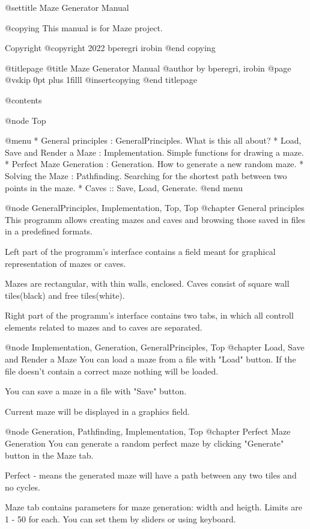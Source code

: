 
@settitle Maze Generator Manual

@copying
This manual is for Maze project.

Copyright @copyright{} 2022 bperegri irobin
@end copying

@titlepage
@title Maze Generator Manual
@author by bperegri, irobin
@page
@vskip 0pt plus 1filll
@insertcopying
@end titlepage

@contents

@node Top

@menu
* General principles : GeneralPrinciples. What is this all about?
* Load, Save and Render a Maze : Implementation. Simple functions for drawing a maze.
* Perfect Maze Generation : Generation. How to generate a new random maze.
* Solving the Maze : Pathfinding. Searching for the shortest path between two points in the maze.
* Caves :: Save, Load, Generate.
@end menu

@node GeneralPrinciples, Implementation, Top, Top
@chapter General principles
  This programm allows creating mazes and caves and browsing those saved in files in a predefined formats.

  Left part of the programm's interface contains a field meant for graphical representation of mazes or caves.

  Mazes are rectangular, with thin walls, enclosed. Caves consist of square wall tiles(black) and free tiles(white).

  Right part of the programm's interface contains two tabs, in which all controll elements related to mazes and to caves are separated.

@node Implementation, Generation, GeneralPrinciples, Top
@chapter Load, Save and Render a Maze
  You can load a maze from a file with "Load" button. If the file doesn't contain a correct maze nothing will be loaded.

  You can save a maze in a file with "Save" button.

  Current maze will be displayed in a graphics field.

@node Generation, Pathfinding, Implementation, Top
@chapter Perfect Maze Generation
  You can generate a random perfect maze by clicking "Generate" button in the Maze tab.

  Perfect - means the generated maze will have a path between any two tiles and no cycles.

  Maze tab contains parameters for maze generation: width and heigth. Limits are 1 - 50 for each. You can set them by sliders or using keyboard.

